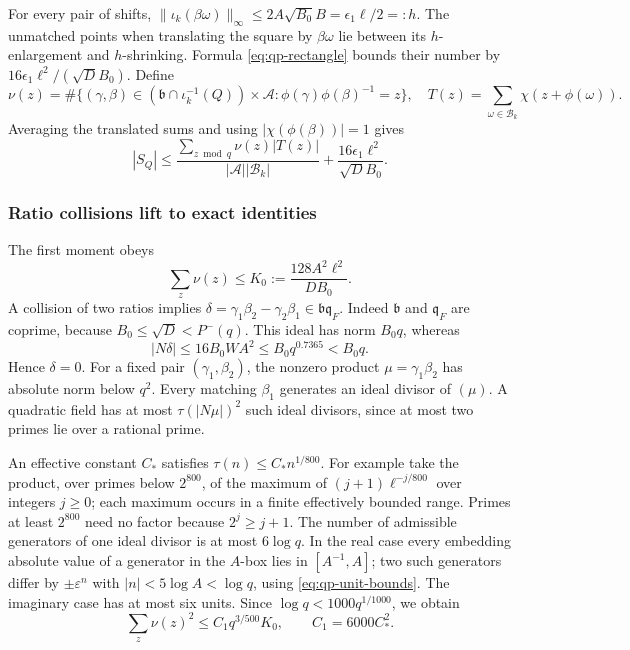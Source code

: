 For every pair of shifts,
$\|\iota_k(\beta\omega)\|_\infty\leq2A\sqrt{B_0}B
=\epsilon_1\ell/2=:h$.  The unmatched points when translating the
square by $\beta\omega$ lie between its $h$-enlargement and
$h$-shrinking.  Formula \eqref{eq:qp-rectangle} bounds their number by
$16\epsilon_1\ell^2/(\sqrt D B_0)$.
Define
\[
 \nu(z)=\#\{(\gamma,\beta)\in
   (\mathfrak b\cap\iota_k^{-1}(Q))\times\mathcal A:
             \phi(\gamma)\phi(\beta)^{-1}=z\},
 \quad
 T(z)=\sum_{\omega\in\mathcal B_k}\chi(z+\phi(\omega)).
\]
Averaging the translated sums and using
$|\chi(\phi(\beta))|=1$ gives
\begin{equation}
 |S_Q|\leq\frac{\sum_{z\bmod q}\nu(z)|T(z)|}
                  {|\mathcal A||\mathcal B_k|}
             +\frac{16\epsilon_1\ell^2}{\sqrt D B_0}.
 \label{eq:qp-shift-average}
\end{equation}

\subsubsection{Ratio collisions lift to exact identities}

The first moment obeys
\begin{equation}
 \sum_z\nu(z)\leq K_0:=\frac{128A^2\ell^2}{DB_0}.
 \label{eq:qp-first-moment}
\end{equation}
A collision of two ratios implies
$\delta=\gamma_1\beta_2-\gamma_2\beta_1\in\mathfrak b\mathfrak q_F$.
Indeed $\mathfrak b$ and $\mathfrak q_F$ are coprime, because
$B_0\leq\sqrt D<P^-(q)$.  This ideal has norm $B_0q$, whereas
\[
 |N\delta|\leq16B_0WA^2\leq B_0q^{0.7365}<B_0q.
\]
Hence $\delta=0$.  For a fixed pair $(\gamma_1,\beta_2)$, the nonzero
product $\mu=\gamma_1\beta_2$ has absolute norm below $q^2$.
Every matching $\beta_1$ generates an ideal divisor of $(\mu)$.
A quadratic field has at most $\tau(|N\mu|)^2$ such ideal divisors,
since at most two primes lie over a rational prime.

An effective constant $C_*$ satisfies $\tau(n)\leq C_*n^{1/800}$.
For example take the product, over primes below $2^{800}$, of the
maximum of $(j+1)\ell^{-j/800}$ over integers $j\geq0$; each maximum
occurs in a finite effectively bounded range.  Primes at least
$2^{800}$ need no factor because $2^j\geq j+1$.
The number of admissible generators of one ideal divisor is at most
$6\log q$.  In the real case every embedding absolute value of a
generator in the $A$-box lies in $[A^{-1},A]$; two such generators
differ by $\pm\varepsilon^n$ with
$|n|<5\log A<\log q$, using \eqref{eq:qp-unit-bounds}.
The imaginary case has at most six units.
Since $\log q<1000q^{1/1000}$, we obtain
\begin{equation}
 \sum_z\nu(z)^2\leq C_1q^{3/500}K_0,
 \qquad C_1=6000C_*^2.
 \label{eq:qp-second-moment}
\end{equation}

